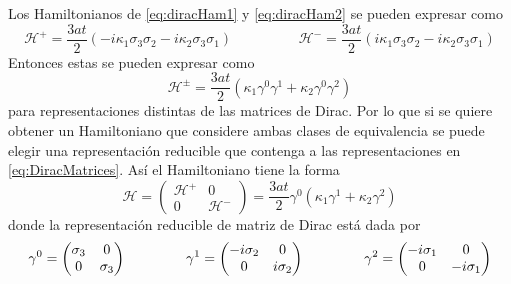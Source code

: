 Los Hamiltonianos de \eqref{eq:diracHam1} y \eqref{eq:diracHam2} se pueden expresar como
\begin{equation}
	\mathcal{H}^{+} = \frac{3at}{2}(-i\kappa_1\sigma_3\sigma_2 - i\kappa_2\sigma_3\sigma_1) \hspace{2cm}\mathcal{H}^{-} = \frac{3at}{2}(i\kappa_1\sigma_3\sigma_2 - i\kappa_2\sigma_3\sigma_1)
\end{equation}
Entonces estas se pueden expresar como
\begin{equation}
	\mathcal{H}^{\pm} = \frac{3at}{2}(\kappa_1 \gamma^0\gamma^1 + \kappa_2\gamma^0\gamma^2)
\end{equation}
para representaciones distintas de las matrices de Dirac. Por lo que si se quiere obtener un Hamiltoniano que considere ambas clases de equivalencia se puede elegir una representación reducible que contenga a las representaciones en \eqref{eq:DiracMatrices}. Así el Hamiltoniano tiene la forma
\begin{equation}
	\nonumber \mathcal{H}  = \begin{pmatrix}
		\mathcal{H}^{+} & 0               \\
		0               & \mathcal{H}^{-}
	\end{pmatrix} = \frac{3at}{2}\gamma^0(\kappa_1\gamma^1+ \kappa_2 \gamma^2)\label{eq:hamilMonGraph1}
\end{equation}
donde la representación reducible de matriz de Dirac está dada por
\begin{equation}
	\gamma^0= \begin{pmatrix}
		\sigma_3 & 0        \\
		0        & \sigma_3
	\end{pmatrix}\hspace{1.5cm}\gamma^1 = \begin{pmatrix}
		-i\sigma_2 & 0         \\
		0          & i\sigma_2
	\end{pmatrix}\hspace{1.5cm} \gamma^2 = \begin{pmatrix}
		-i\sigma_1 & 0          \\
		0          & -i\sigma_1
	\end{pmatrix}\label{eq:reducDirac}
\end{equation}
